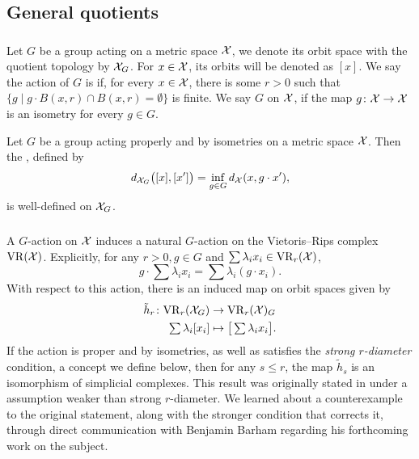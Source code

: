 
\subsection{General quotients}

\subsubsection{}

Let $G$ be a group acting on a metric space $\mathcal{X}$, we denote its orbit space with the quotient topology by $\mathcal{X}_G$.
For $x \in \mathcal{X}$, its orbits will be denoted as $[x]$.
We say the action of $G$ is  if, for every $x \in \mathcal{X}$, there is some $r>0$ such that $\{g \mid g\cdot B(x,r) \cap B(x,r) = \emptyset\}$ is finite.
We say $G$  on $\mathcal{X}$, if the map $g \colon \mathcal{X} \to \mathcal{X}$ is an isometry for every $g \in G$.

Let $G$ be a group acting properly and by isometries on a metric space $\mathcal{X}$.
Then the , defined by
\[
d_{\mathcal{X}_G}\big([x], [x']\big) = \inf_{g \in G} d_{\mathcal{X}}(x, g \cdot x'),
\]
is well-defined on $\mathcal{X}_G$.

\subsubsection{}\label{ss:h}

A \(G\)-action on $\mathcal{X}$ induces a natural \(G\)-action on the Vietoris--Rips complex $\mathrm{VR}(\mathcal{X})$.
Explicitly, for any \(r > 0, g\in G\) and $\sum \lambda_i x_i \in \mathrm{VR}_r(\mathcal{X})$,
\[
g \cdot \sum \lambda_i x_i = \sum \lambda_i (g\cdot x_i).
\]
With respect to this action, there is an induced map on orbit spaces given by
\begin{align*}
	\tilde h_r \colon \mathrm{VR}_r(\mathcal{X}_G) &\to \mathrm{VR}_r(\mathcal{X})_G \\
	\textstyle\sum\lambda_i [x_i] &\mapsto \textstyle \big[\sum\lambda_i x_i\big].
\end{align*}
If the action is proper and by isometries, as well as satisfies the \textit{strong \(r\)-diameter} condition, a concept we define below, then for any \(s \leq r\), the map $\tilde{h}_s$ is an isomorphism of simplicial complexes.
This result was originally stated in \cite[Prop.~3.5]{adams2022metric} under a assumption weaker than strong \(r\)-diameter.
We learned about a counterexample to the original statement, along with the stronger condition that corrects it, through direct communication with Benjamin Barham regarding his forthcoming work on the subject.

